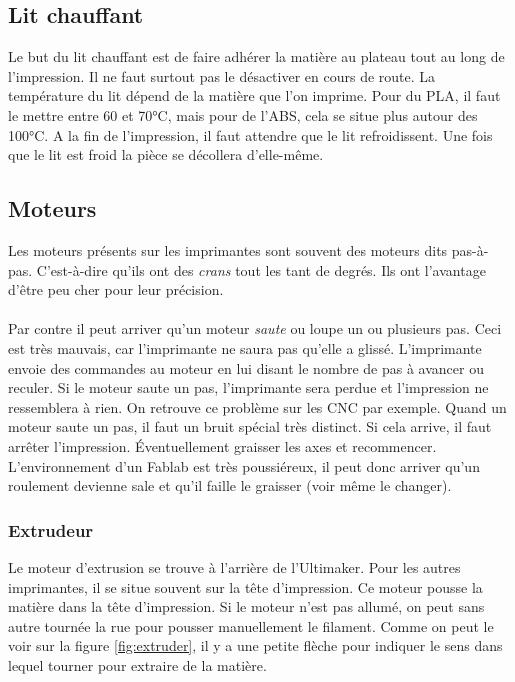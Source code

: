 \subsection{Lit chauffant}

Le but du lit chauffant est de faire adhérer la matière au plateau tout au long de l'impression. Il ne faut surtout pas le désactiver en cours de route. La température du lit dépend de la matière que l'on imprime. Pour du PLA, il faut le mettre entre 60 et 70°C, mais pour de l'ABS, cela se situe plus autour des 100°C. A la fin de l'impression, il faut attendre que le lit refroidissent. Une fois que le lit est froid la pièce se décollera d'elle-même.

\subsection{Moteurs}

Les moteurs présents sur les imprimantes sont souvent des moteurs dits pas-à-pas. C'est-à-dire qu'ils ont des \emph{crans} tout les tant de degrés. Ils ont l'avantage d'être peu cher pour leur précision. 

 \paragraph{} Par contre il peut arriver qu'un moteur \emph{saute} ou loupe un ou plusieurs pas. Ceci est très mauvais, car l'imprimante ne saura pas qu'elle a glissé. L'imprimante envoie des commandes au moteur en lui disant le nombre de pas à avancer ou reculer. Si le moteur saute un pas, l'imprimante sera perdue et l'impression ne ressemblera à rien. On retrouve ce problème sur les CNC par exemple. Quand un moteur saute un pas, il faut un bruit spécial très distinct. Si cela arrive, il faut arrêter l'impression. Éventuellement graisser les axes et recommencer. L'environnement d'un Fablab est très poussiéreux, il peut donc arriver qu'un roulement devienne sale et qu'il faille le graisser (voir même le changer).

\subsubsection{Extrudeur}

Le moteur d'extrusion se trouve à l'arrière de l'Ultimaker. Pour les autres imprimantes, il se situe souvent sur la tête d'impression. Ce moteur pousse la matière dans la tête d'impression. Si le moteur n'est pas allumé, on peut sans autre tournée la rue pour pousser manuellement le filament. Comme on peut le voir sur la figure \ref{fig:extruder}, il y a une petite flèche pour indiquer le sens dans lequel tourner pour extraire de la matière.

